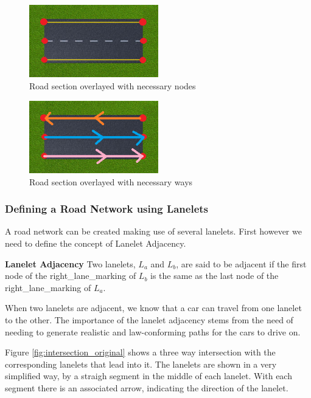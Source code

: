 \begin{figure}[h!]
    \centering
    \includegraphics[width=0.5\textwidth]{road_with_nodes}
    \caption{Road section overlayed with necessary nodes \label{fig:road_to_define_with_nodes} }
\end{figure}

\begin{figure}[h!]
    \centering
    \includegraphics[width=0.5\textwidth]{road_with_ways}
    \caption{Road section overlayed with necessary ways \label{fig:road_to_define_with_ways} }
\end{figure}

\subsubsection{Defining a Road Network using Lanelets}

A road network can be created making use of several lanelets. First however we need to define the concept of Lanelet Adjacency.

\textbf{Lanelet Adjacency} Two lanelets, $L_a$ and $L_b$, are said to be adjacent if the first node of the right\_lane\_marking of $L_b$ is the same as the last node of the right\_lane\_marking of $L_a$.

When two lanelets are adjacent, we know that a car can travel from one lanelet to the other. The importance of the lanelet adjacency stems from the need of needing to generate realistic and law-conforming paths for the cars to drive on.

Figure \ref{fig:intersection_original} shows a three way intersection with the corresponding lanelets that lead into it. The lanelets are shown in a very simplified way, by a straigh segment in the middle of each lanelet. With each segment there is an associated arrow, indicating the direction of the lanelet.

